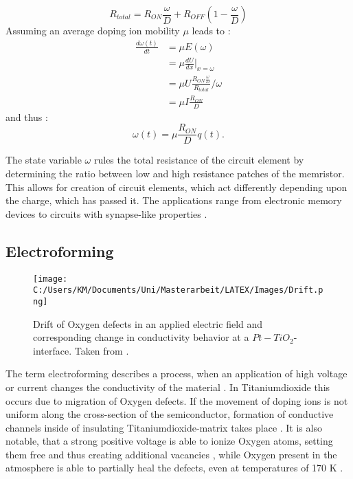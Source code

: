 \documentclass[12pt]{article}
\begin{document}
\begin{equation}
R_{total} = R_{ON}\frac{\omega}{D}+R_{OFF}(1-\frac{\omega}{D})
\end{equation} 
Assuming an average doping ion mobility $\mu$ leads to :
\begin{align*}
\frac{d\omega (t)}{dt} &= \mu E(\omega) \\
											 &= \mu \frac{dU}{dx}|_{x = \omega} \\
											 &= \mu U\frac{R_{ON}\frac{\omega}{D}}{R_{total}}/ \omega \\
											 &= \mu I\frac{R_{ON}}{D}
\end{align*}
and thus :
\begin{equation}
\omega (t) = \mu \frac{R_{ON}}{D}q(t).
\end{equation}

The state variable $\omega$ rules the total resistance of the circuit element by determining the ratio between low and high resistance patches of the memristor. This allows for creation of circuit elements, which act differently depending upon the charge, which has passed it.
The applications range from electronic memory devices to circuits with synapse-like properties \cite{Missing}.

\subsection{Electroforming}
\begin{wrapfigure}[19]{h}[0cm]{7cm}
  \texttt{[image: C:/Users/KM/Documents/Uni/Masterarbeit/LATEX/Images/Drift.png]}
	\caption{Drift of Oxygen defects in an applied electric field and corresponding change in conductivity behavior at a $Pt-TiO_2$-interface. Taken from \cite{Family}.}
	\label{fig:Drift}
\end{wrapfigure}
	The term electroforming describes a process, when an application of high voltage or current changes the conductivity of the material \cite{Effect}. In Titaniumdioxide this occurs due to migration of Oxygen defects. If the movement of doping ions is not uniform along the cross-section of the semiconductor, formation of conductive channels inside of insulating Titaniumdioxide-matrix takes place \cite{Effect}. It is also notable, that a strong positive voltage is able to ionize Oxygen atoms, setting them free and thus creating additional vacancies \cite{Effect}, while Oxygen present in the atmosphere is able to partially heal the defects, even at temperatures of 170 K \cite{Achhab}.
	
\end{document}
